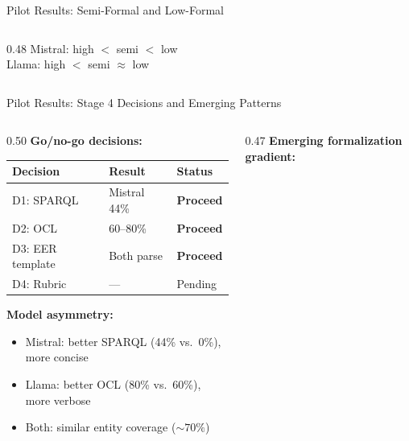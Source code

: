 \documentclass[aspectratio=169]{beamer}
\begin{document}
\begin{frame}{Pilot Results: Semi-Formal and Low-Formal}
\begin{columns}[T]
\begin{column}{0.48\textwidth}
\vspace{0.2em}
{\small Mistral: high $<$ semi $<$ low \checkmark\\Llama: high $<$ semi $\approx$ low}
\end{column}
\end{columns}

\end{frame}

\begin{frame}{Pilot Results: Stage 4 Decisions and Emerging Patterns}

\begin{columns}[T]
\begin{column}{0.50\textwidth}
\textbf{Go/no-go decisions:}\\[0.5em]
{\small
\begin{tabular}{@{}lll@{}}
\toprule
Decision & Result & Status \\
\midrule
D1: SPARQL & Mistral 44\% & \textbf{Proceed} \\
D2: OCL & 60--80\% & \textbf{Proceed} \\
D3: EER template & Both parse & \textbf{Proceed} \\
D4: Rubric & --- & Pending \\
\bottomrule
\end{tabular}
}

\vspace{0.8em}
\textbf{Model asymmetry:}
\begin{itemize}\small
    \item Mistral: better SPARQL (44\% vs.\ 0\%), more concise
    \item Llama: better OCL (80\% vs.\ 60\%), more verbose
    \item Both: similar entity coverage (${\sim}70\%$)
\end{itemize}
\end{column}

\begin{column}{0.47\textwidth}
\textbf{Emerging formalization gradient:}\\[0.5em]

\end{column}
\end{columns}
\end{frame}
\end{document}
